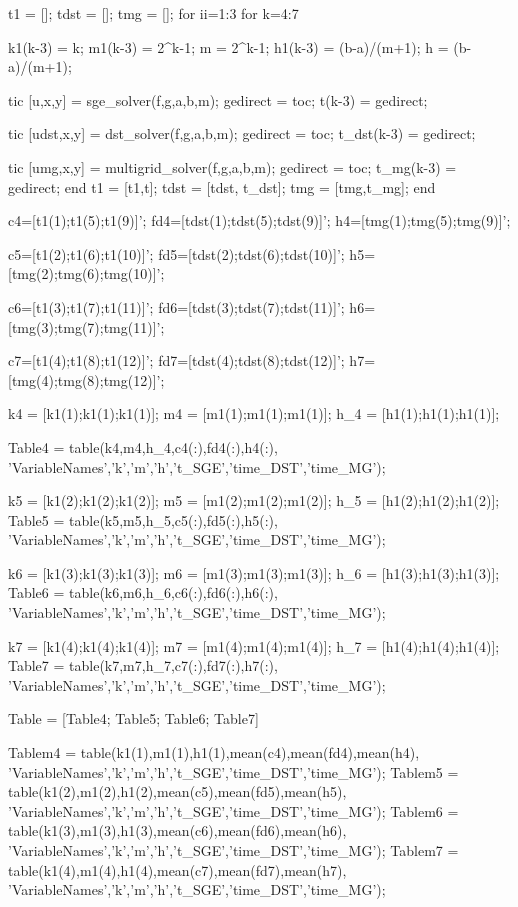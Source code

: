 \documentclass[12pt,a4paper]{article}
\begin{document}
	t1 = [];
	tdst = [];
	tmg = [];
	for ii=1:3
	for k=4:7
	
	k1(k-3) = k;
	m1(k-3) = 2^k-1;
	m = 2^k-1; 
	h1(k-3) = (b-a)/(m+1);
	h = (b-a)/(m+1);
	
	tic
	[u,x,y] = sge_solver(f,g,a,b,m);
	gedirect = toc;
	t(k-3) = gedirect;
	
	tic
	[udst,x,y] = dst_solver(f,g,a,b,m);
	gedirect = toc;
	t_dst(k-3) = gedirect;
	
	tic
	[umg,x,y] = multigrid_solver(f,g,a,b,m);
	gedirect = toc;
	t_mg(k-3) = gedirect;
	end 
	t1 = [t1,t];
	tdst = [tdst, t_dst]; 
	tmg = [tmg,t_mg];
	end
	
	c4=[t1(1);t1(5);t1(9)]'; 
	fd4=[tdst(1);tdst(5);tdst(9)]'; 
	h4=[tmg(1);tmg(5);tmg(9)]';
	
	c5=[t1(2);t1(6);t1(10)]'; 
	fd5=[tdst(2);tdst(6);tdst(10)]'; 
	h5=[tmg(2);tmg(6);tmg(10)]';
	
	c6=[t1(3);t1(7);t1(11)]'; 
	fd6=[tdst(3);tdst(7);tdst(11)]'; 
	h6=[tmg(3);tmg(7);tmg(11)]';
	
	c7=[t1(4);t1(8);t1(12)]'; 
	fd7=[tdst(4);tdst(8);tdst(12)]'; 
	h7=[tmg(4);tmg(8);tmg(12)]';
	
	k4 = [k1(1);k1(1);k1(1)];
	m4 = [m1(1);m1(1);m1(1)];
	h_4 = [h1(1);h1(1);h1(1)];
	
	Table4 = table(k4,m4,h_4,c4(:),fd4(:),h4(:), 'VariableNames',{'k','m','h','t_SGE','time_DST','time_MG'});
	
	k5 = [k1(2);k1(2);k1(2)];
	m5 = [m1(2);m1(2);m1(2)];
	h_5 = [h1(2);h1(2);h1(2)];
	Table5 = table(k5,m5,h_5,c5(:),fd5(:),h5(:), 'VariableNames',{'k','m','h','t_SGE','time_DST','time_MG'});
	
	k6 = [k1(3);k1(3);k1(3)];
	m6 = [m1(3);m1(3);m1(3)];
	h_6 = [h1(3);h1(3);h1(3)];
	Table6 = table(k6,m6,h_6,c6(:),fd6(:),h6(:), 'VariableNames',{'k','m','h','t_SGE','time_DST','time_MG'});
	
	k7 = [k1(4);k1(4);k1(4)];
	m7 = [m1(4);m1(4);m1(4)];
	h_7 = [h1(4);h1(4);h1(4)];
	Table7 = table(k7,m7,h_7,c7(:),fd7(:),h7(:), 'VariableNames',{'k','m','h','t_SGE','time_DST','time_MG'});
	
	
	Table = [Table4; Table5; Table6; Table7]
	
	
	Tablem4 = table(k1(1),m1(1),h1(1),mean(c4),mean(fd4),mean(h4), 'VariableNames',{'k','m','h','t_SGE','time_DST','time_MG'});
	Tablem5 = table(k1(2),m1(2),h1(2),mean(c5),mean(fd5),mean(h5), 'VariableNames',{'k','m','h','t_SGE','time_DST','time_MG'});
	Tablem6 = table(k1(3),m1(3),h1(3),mean(c6),mean(fd6),mean(h6), 'VariableNames',{'k','m','h','t_SGE','time_DST','time_MG'});
	Tablem7 = table(k1(4),m1(4),h1(4),mean(c7),mean(fd7),mean(h7), 'VariableNames',{'k','m','h','t_SGE','time_DST','time_MG'});
	
\end{document}
